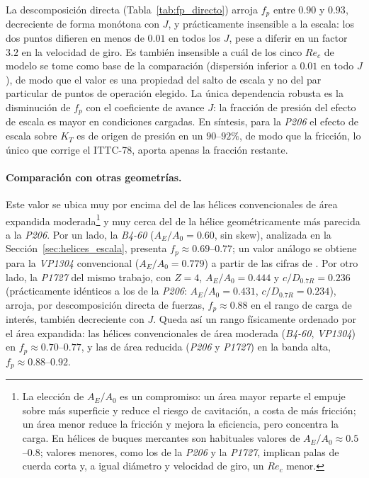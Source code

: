 La descomposición directa (Tabla~\ref{tab:fp_directo}) arroja $f_p$ entre $0.90$ y $0.93$, decreciente de forma
monótona con $J$, y prácticamente insensible a la escala: los dos puntos difieren en
menos de $0.01$ en todos los $J$, pese a diferir en un factor $3.2$ en la velocidad de
giro. Es también insensible a cuál de los cinco $Re_c$ de modelo se tome como base de la
comparación (dispersión inferior a $0.01$ en todo $J$), de modo que el valor es una
propiedad del salto de escala y no del par particular de puntos de operación elegido. La
única dependencia robusta es la disminución de $f_p$ con el coeficiente de avance $J$: la
fracción de presión del efecto de escala es mayor en condiciones cargadas. En síntesis,
para la \textit{P206} el efecto de escala sobre $K_T$ es de origen de presión en un $90$--$92\%$,
de modo que la fricción, lo único que corrige el ITTC-78, aporta apenas la fracción
restante.

\paragraph{Comparación con otras geometrías.} Este valor se ubica muy por encima del de
las hélices convencionales de área expandida moderada\footnote{La elección de $A_E/A_0$ es un compromiso: un área mayor reparte el empuje sobre más superficie y reduce el riesgo de cavitación, a costa de más fricción; un área menor reduce la fricción y mejora la eficiencia, pero concentra la carga. En hélices de buques mercantes son habituales valores de $A_E/A_0\approx0.5$--$0.8$; valores menores, como los de la \textit{P206} y la \textit{P1727}, implican palas de cuerda corta y, a igual diámetro y velocidad de giro, un $Re_c$ menor.} y muy cerca del de la hélice
geométricamente más parecida a la \textit{P206}. Por un lado, la \textit{B4-60} ($A_E/A_0=0.60$, sin skew),
analizada en la Sección~\ref{sec:helices_escala}, presenta $f_p\approx0.69$--$0.77$; un
valor análogo se obtiene para la \textit{VP1304} convencional ($A_E/A_0=0.779$) a partir de las
cifras de \citet{gallotti2026}. Por otro lado, la \textit{P1727} del mismo trabajo, con $Z=4$, $A_E/A_0=0.444$ y $c/D_{0.7R}=0.236$ (prácticamente idénticos a los de la \textit{P206}: $A_E/A_0=0.431$, $c/D_{0.7R}=0.234$), arroja, por descomposición directa de fuerzas,
$f_p\approx0.88$ en el rango de carga de interés, también decreciente con $J$. Queda así
un rango físicamente ordenado por el área expandida: las hélices convencionales de área
moderada (\textit{B4-60}, \textit{VP1304}) en $f_p\approx0.70$--$0.77$, y las de área reducida (\textit{P206} y
\textit{P1727}) en la banda alta, $f_p\approx0.88$--$0.92$.

